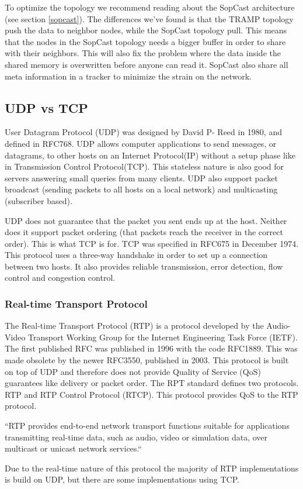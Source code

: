 To optimize the topology we recommend reading about the SopCast architecture (see section \ref{sopcast}). The differences we've found is that the TRAMP topology push the data to neighbor nodes, while the SopCast topology pull. This means that the nodes in the SopCast topology needs a bigger buffer in order to share with their neighbors. This will also fix the problem where the data inside the shared memory is overwritten before anyone can read it. SopCast also share all meta information in a tracker to minimize the strain on the network.

\subsection{UDP vs TCP}
User Datagram Protocol (UDP) was designed by David P- Reed in 1980, and defined in RFC768. UDP allows computer applications to send messages, or datagrams, to other hosts on an Internet Protocol(IP) without a setup phase like in Transmission Control Protocol(TCP). This stateless nature is also good for servers answering small queries from many clients. UDP also support packet broadcast (sending packets to all hosts on a local network) and multicasting (subscriber based).

UDP does not guarantee that the packet you sent ends up at the host. Neither does it support packet ordering (that packets reach the receiver in the correct order). This is what TCP is for. TCP was specified in RFC675 in December 1974. This protocol uses a three-way handshake in order to set up a connection between two hosts. It also provides reliable transmission, error detection, flow control and congestion control. 

\subsubsection{Real-time Transport Protocol}
The Real-time Transport Protocol (RTP) is a protocol developed by the Audio-Video Transport Working Group for the Internet Engineering Task Force (IETF). The first published RFC was published in 1996 with the code RFC1889. This was made obsolete by the newer RFC3550, published in 2003\cite{RFC3550}. This protocol is built on top of UDP and therefore does not provide Quality of Service (QoS) guarantees like delivery or packet order. The RPT standard defines two protocols. RTP and RTP Control Protocol (RTCP). This protocol provides QoS to the RTP protocol.

``RTP provides end-to-end network transport functions suitable for applications transmitting real-time data, such as audio, video or simulation data, over multicast or unicast network services.``\cite{RFC3550}

Due to the real-time nature of this protocol the majority of RTP implementations is build on UDP, but there are some implementations using TCP.







